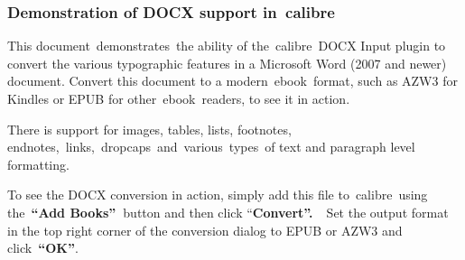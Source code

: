 \documentclass[\officeparserdriver aspectratio=169,12pt,xcolor=table]{beamer}
\begin{document}
\begin{frame}[allowframebreaks]
\frametitle{\protect\textcolor{hex17365D}{Demonstration of DOCX support in~calibre}}
\label{demonstration-of-docx-support-in-calibre}
\textcolor{hex000000}{This document~demonstrates~the ability of the~calibre~DOCX Input plugin to convert the various typographic features in a Microsoft Word (2007 and newer) document. Convert this document to a modern~ebook~format, such as AZW3 for Kindles or EPUB for other~ebook~readers, to see it in action.}

\textcolor{hex000000}{There is support for images, tables, lists, footnotes, endnotes,~links,~dropcaps~and~various~types~of text and paragraph level formatting.}

\textcolor{hex000000}{To see the DOCX conversion in action, simply add this file to~calibre~using the~}\textcolor{hex000000}{\textbf{“Add Books”~}}\textcolor{hex000000}{button and then click “}\textcolor{hex000000}{\textbf{Convert”.~}}\textcolor{hex000000}{~Set the output format in the top right corner of the conversion dialog to EPUB or AZW3 and click~}\textcolor{hex000000}{\textbf{“OK”}}\textcolor{hex000000}{.}
\end{frame}
\note{\textcolor{hex000000}{Slide Note 1.}}
\end{document}
